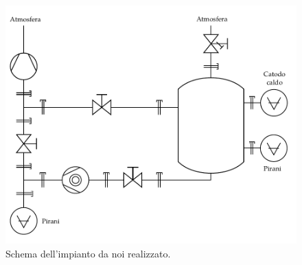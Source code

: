 \begin{figure}[b!]
   \includegraphics[width=14.5cm]{drawing.pdf}
   \caption{Schema dell'impianto da noi realizzato.}
   \label{fig:schema}
\end{figure}

